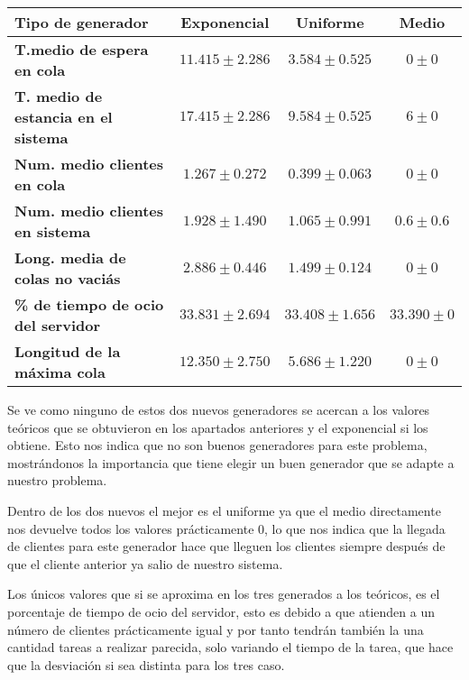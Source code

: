 \documentclass[]{article}
\begin{document}
\begin{table}[H]
	\begin{center}
		\begin{tabularx}{1\textwidth}{|X|c|c|c|}
			\hline
			\textbf{Tipo de generador}&\textbf{ Exponencial} &  \textbf{Uniforme} & \textbf{Medio} \\
			\hline \hline
			\textbf{T.medio de espera en cola}& $11.415\pm2.286$ & $3.584\pm0.525$ & $0\pm0$ \\ \hline
			\textbf{T. medio de estancia en el sistema} & $17.415\pm2.286$ & $9.584\pm0.525$ & $6\pm0$ \\ \hline
			\textbf{Num. medio clientes en cola} & $1.267\pm0.272$& $0.399\pm0.063$ & $0\pm0$ \\  \hline
			\textbf{Num. medio clientes en sistema} & $1.928\pm1.490$ & $1.065\pm0.991$ & $0.6\pm0.6$ \\ \hline
			\textbf{Long. media de colas no vaciás} & $2.886\pm0.446$& $1.499\pm0.124$ & $0\pm0$ \\ \hline
			\textbf{\% de tiempo de ocio del servidor} & $33.831\pm2.694$ & $33.408\pm1.656$ & $33.390\pm0$ \\ \hline
			\textbf{Longitud de la máxima cola} &$12.350\pm2.750$& $5.686\pm1.220$ & $0\pm0$    \\ \hline
		\end{tabularx}
		
	\end{center}
	\end{table}
Se ve como ninguno de estos dos nuevos generadores se acercan a los valores teóricos que se obtuvieron en los apartados anteriores y el exponencial si los obtiene. Esto nos indica que no son  buenos generadores para este problema, mostrándonos la importancia que tiene elegir un buen generador que se adapte a nuestro problema.
\newline

 Dentro de los dos nuevos el mejor es el uniforme ya que el medio directamente nos devuelve todos los valores prácticamente 0, lo que nos indica que la llegada de clientes para este generador hace que lleguen los clientes siempre después de que el cliente anterior ya salio de nuestro sistema.

Los únicos valores que si se aproxima en los tres generados a los teóricos, es el porcentaje de tiempo de ocio del servidor, esto es debido a que atienden a un número de clientes prácticamente igual y por tanto tendrán también la una cantidad tareas a realizar parecida, solo variando el tiempo de la tarea, que hace que la desviación si sea distinta para los tres caso.
\end{document}
